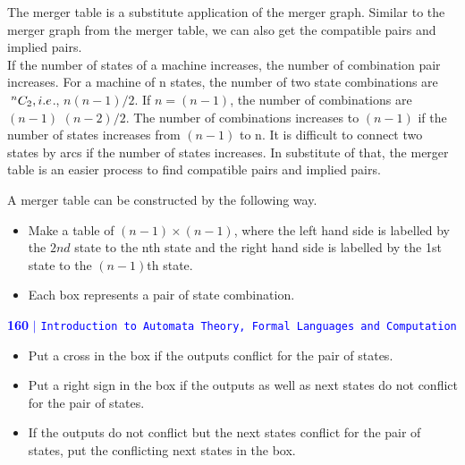 \documentclass[a4]{article}
\begin{document}

\vspace*{0.2cm}
The merger table is a substitute application of the merger graph. Similar to the merger graph from the
merger table, we can also get the compatible pairs and implied pairs.\\
\hspace*{0.5cm} If the number of states of a machine increases, the number of combination pair increases. For a machine of n states, the number of two state combinations are $\textcolor[rgb]{1.00,1.00,1.00}{.}^nC_2, i.e$., $n(n-1)/2$. If $n = (n-1)$, the number of combinations are $(n-1)$ $(n-2)/2$. The number of combinations increases to $(n-1)$ if the number of states increases from $(n-1)$ to n. It is difficult to connect two states by arcs if the number of states increases. In substitute of that, the merger table is an easier process to find compatible pairs and implied pairs.\\

\vspace*{0.5cm}


\vspace*{0.2cm}
A merger table can be constructed by the following way.\\

\begin{itemize}
  \item Make a table of $(n-1) \times (n-1)$, where the left hand side is labelled by the $2nd$ state to the nth state
and the right hand side is labelled by the 1st state to the $(n-1)$th state.
  \item Each box represents a pair of state combination.
\end{itemize}

\newpage

\begin{flushleft}
 \textcolor{blue}{\textbf{160}\hspace*{0.1cm} \textbf{$|$} \hspace*{0.1cm} \texttt{Introduction to Automata Theory, Formal Languages and Computation}}
  \end{flushleft}


\vspace*{1cm}
\begin{itemize}
  \item Put a cross in the box if the outputs conflict for the pair of states.\\
  \item Put a right sign in the box if the outputs as well as next states do not conflict for the pair of states.\\
  \item If the outputs do not conflict but the next states conflict for the pair of states, put the conflicting
next states in the box.\\
\end{itemize}
\end{document}
